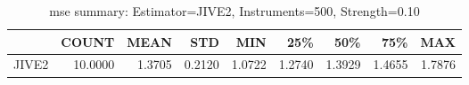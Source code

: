 \begin{table}[ht]
\centering
\caption{mse summary: Estimator=JIVE2, Instruments=500, Strength=0.10}
\begin{tabular}{lrrrrrrrr}
\toprule
 & COUNT & MEAN & STD & MIN & 25\% & 50\% & 75\% & MAX \\
\midrule
JIVE2 & 10.0000 & 1.3705 & 0.2120 & 1.0722 & 1.2740 & 1.3929 & 1.4655 & 1.7876 \\
\bottomrule
\end{tabular}
\end{table}

